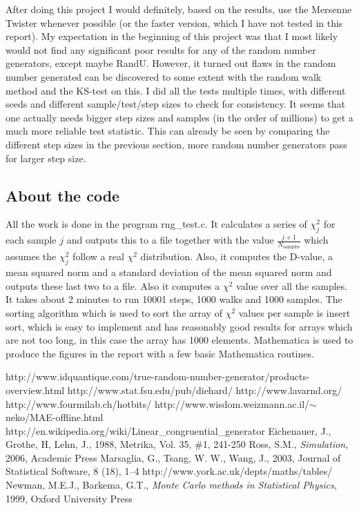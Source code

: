 \documentclass[10pt,a4paper]{article}
\begin{document}
\newline
\noindent After doing this project I would definitely, based on the results, use the Mersenne Twister whenever possible (or the faster version, which I have not tested in this report). My expectation in the beginning of this project was that I most likely would not find any significant poor results for any of the random number generators, except maybe RandU. However, it turned out flaws in the random number generated can be discovered to some extent with the random walk method and the KS-test on this. I did all the tests multiple times, with different seeds and different sample/test/step sizes to check for consistency. It seems that one actually needs bigger step sizes and samples (in the order of millions) to get a much more reliable test statistic. This can already be seen by comparing the different step sizes in the previous section, more random number generators pass for larger step size.

\subsection{About the code}
All the work is done in the program rng\_test.c. It calculates a series of $\chi^2_{j}$ for each sample $j$ and outputs this to a file together with the value $\frac{j+1}{N_{\text{samples}}}$ which assumes the $\chi^2_{j}$ follow a real $\chi^2$ distribution. Also, it computes the D-value, a mean squared norm and a standard deviation of the mean squared norm and outputs these last two to a file. Also it computes a $\chi^2$ value over all the samples. It takes about 2 minutes to run 10001 steps, 1000 walks and 1000 samples. The sorting algorithm which is used to sort the array of $\chi^2$ values per sample is insert sort, which is easy to implement and has reasonably good results for arrays which are not too long, in this case the array has 1000 elements. Mathematica is used to produce the figures in the report with a few basic Mathematica routines.

\begin{thebibliography}{15}
  http://www.idquantique.com/true-random-number-generator/products-overview.html 
  http://www.stat.fsu.edu/pub/diehard/
  http://www.lavarnd.org/
  http://www.fourmilab.ch/hotbits/
  http://www.wisdom.weizmann.ac.il/$\sim$neko/MAE-offline.html
  http://en.wikipedia.org/wiki/Linear\_congruential\_generator
  Eichenauer, J., Grothe, H, Lehn, J., 1988, Metrika, Vol. 35, \#1, 241-250
  Ross, S.M., \emph{Simulation}, 2006, Academic Press
  Marsaglia, G., Tsang, W. W., Wang, J., 2003, Journal of Statistical Software, 8 (18), 1–4
  http://www.york.ac.uk/depts/maths/tables/
  Newman, M.E.J., Barkema, G.T., \emph{Monte Carlo methods in Statistical Physics}, 1999, Oxford University Press
\end{thebibliography}
\end{document}
